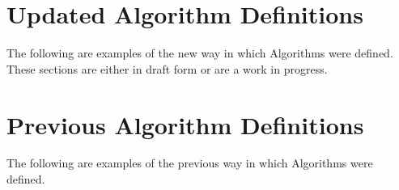 \documentclass{article}
\begin{document}
\section*{Updated Algorithm Definitions}
The following are examples of the new way in which Algorithms were defined. These sections are either in draft form or are a work in progress.





\section*{Previous Algorithm Definitions}
The following are examples of the previous way in which Algorithms were defined.






\end{document}
